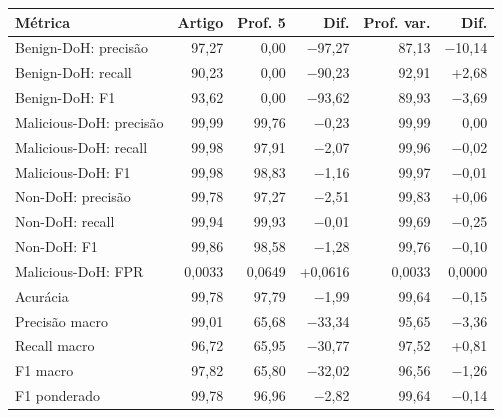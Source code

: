 \begin{tabular}{lrrrrr}
\hline
\textbf{Métrica} & \textbf{Artigo} & \textbf{Prof. 5} & \textbf{Dif.} & \textbf{Prof. var.} & \textbf{Dif.} \\ \hline
Benign-DoH: precisão & 97,27 & 0,00 & $-$97,27 & 87,13 & $-$10,14 \\
Benign-DoH: recall & 90,23 & 0,00 & $-$90,23 & 92,91 & +2,68 \\
Benign-DoH: F1 & 93,62 & 0,00 & $-$93,62 & 89,93 & $-$3,69 \\
Malicious-DoH: precisão & 99,99 & 99,76 & $-$0,23 & 99,99 & 0,00 \\
Malicious-DoH: recall & 99,98 & 97,91 & $-$2,07 & 99,96 & $-$0,02 \\
Malicious-DoH: F1 & 99,98 & 98,83 & $-$1,16 & 99,97 & $-$0,01 \\
Non-DoH: precisão & 99,78 & 97,27 & $-$2,51 & 99,83 & +0,06 \\
Non-DoH: recall & 99,94 & 99,93 & $-$0,01 & 99,69 & $-$0,25 \\
Non-DoH: F1 & 99,86 & 98,58 & $-$1,28 & 99,76 & $-$0,10 \\
Malicious-DoH: FPR & 0,0033 & 0,0649 & +0,0616 & 0,0033 & 0,0000 \\
\hline
Acurácia & 99,78 & 97,79 & $-$1,99 & 99,64 & $-$0,15 \\
Precisão macro & 99,01 & 65,68 & $-$33,34 & 95,65 & $-$3,36 \\
Recall macro & 96,72 & 65,95 & $-$30,77 & 97,52 & +0,81 \\
F1 macro & 97,82 & 65,80 & $-$32,02 & 96,56 & $-$1,26 \\
F1 ponderado & 99,78 & 96,96 & $-$2,82 & 99,64 & $-$0,14 \\
\hline
\end{tabular}
